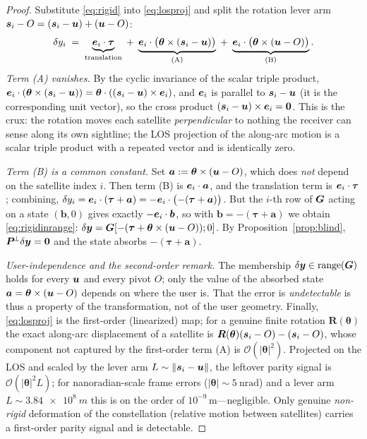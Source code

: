 \begin{proof}
Substitute \eqref{eq:rigid} into \eqref{eq:losproj} and split the rotation lever arm
$\bm{s}_i-O=(\bm{s}_i-\bm{u})+(\bm{u}-O)$:
\begin{equation}
  \delta y_i
  \;=\; \underbrace{\bm{e}_i\cdot\bm\tau}_{\text{translation}}
     \;+\; \underbrace{\bm{e}_i\cdot\bigl(\bm\theta\times(\bm{s}_i-\bm{u})\bigr)}_{\text{(A)}}
     \;+\; \underbrace{\bm{e}_i\cdot\bigl(\bm\theta\times(\bm{u}-O)\bigr)}_{\text{(B)}} .
  \label{eq:threeterms}
\end{equation}
\emph{Term (A) vanishes.} By the cyclic invariance of the scalar triple product,
$\bm{e}_i\cdot(\bm\theta\times(\bm{s}_i-\bm{u}))=\bm\theta\cdot((\bm{s}_i-\bm{u})\times\bm{e}_i)$, and
$\bm{e}_i$ is parallel to $\bm{s}_i-\bm{u}$ (it is the corresponding unit vector), so the cross
product $(\bm{s}_i-\bm{u})\times\bm{e}_i=\bm 0$. This is the crux: the rotation moves each
satellite \emph{perpendicular} to nothing the receiver can sense along its own
sightline; the LOS projection of the along-arc motion is a scalar triple product with a
repeated vector and is identically zero.

\emph{Term (B) is a common constant.} Set $\bm a:=\bm\theta\times(\bm{u}-O)$, which does
\emph{not} depend on the satellite index $i$. Then term (B) is $\bm{e}_i\cdot\bm a$, and
the translation term is $\bm{e}_i\cdot\bm\tau$; combining, $\delta y_i=\bm{e}_i\cdot(\bm\tau
+\bm a)=-\bm{e}_i\cdot\bigl(-(\bm\tau+\bm a)\bigr)$. But the $i$-th row of $\bm{G}$ acting on
a state $(\bm b,0)$ gives exactly $-\bm{e}_i\cdot\bm b$, so with $\bm b=-(\bm\tau+\bm a)$
we obtain \eqref{eq:rigidinrange}: $\delta\bm{y}=\bm{G}[-(\bm\tau+\bm\theta\times(\bm{u}-O));0]$.
By Proposition~\ref{prop:blind}, $\bm{P}^{\!\perp}\delta\bm{y}=\bm 0$ and the state absorbs
$-(\bm\tau+\bm a)$.

\emph{User-independence and the second-order remark.} The membership
$\delta\bm{y}\in\operatorname{range}(\bm{G})$ holds for every $\bm{u}$ and every pivot $O$; only the value of
the absorbed state $\bm a=\bm\theta\times(\bm{u}-O)$ depends on where the user is. That the
error is \emph{undetectable} is thus a property of the transformation, not of the user
geometry. Finally, \eqref{eq:losproj} is the first-order (linearized) map; for a genuine
finite rotation $\bm R(\bm\theta)$ the exact along-arc displacement of a satellite is
$\bm R(\bm\theta)(\bm{s}_i-O)-(\bm{s}_i-O)$, whose component not captured by the first-order
term (A) is $\mathcal{O}(|\bm\theta|^2)$. Projected on the LOS and scaled by the lever
arm $L\sim\|\bm{s}_i-\bm{u}\|$, the leftover parity signal is $\mathcal{O}(|\bm\theta|^2 L)$;
for nanoradian-scale frame errors ($|\bm\theta|\sim\SI{5}{\nano\radian}$) and a lever
arm $L\sim\SI{3.84e8}{m}$ this is on the order of $10^{-9}\,$m---negligible. Only genuine
\emph{non-rigid} deformation of the constellation (relative motion between satellites)
carries a first-order parity signal and is detectable.
\end{proof}

